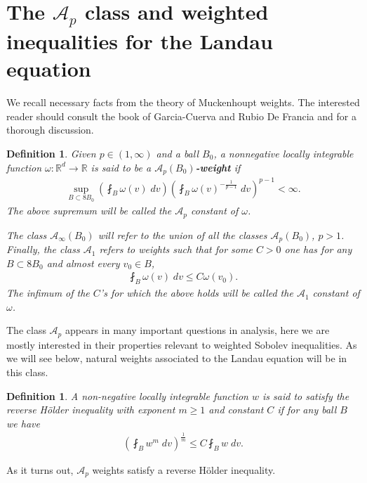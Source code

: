 \documentclass[12pt,american]{amsart}
\numberwithin{equation}{section}
\theoremstyle{plain}
\newtheorem{DEF}[thm]{Definition}
\theoremstyle{definition}                  %
\def\Ap{\mathcal{A}_p}
\def\A1{\mathcal{A}_1}
\def\Ainfty{\mathcal{A}_\infty}
\begin{document}
\section{The $\Ap$ class and weighted inequalities for the Landau equation}\label{section:A_p class and weighted inequalities}

  We recall necessary facts from the theory of Muckenhoupt weights. The interested reader should consult the book of Garcia-Cuerva and Rubio De Francia \cite[Chapter IV]{GarciaCuervaRubioDeFrancia1985} and \cite{Turesson} for a thorough discussion.  
  
  \begin{DEF}
Given $p\in(1,\infty)$ and a ball $B_0$, a nonnegative locally integrable function $\omega:\mathbb{R}^d\to\mathbb{R}$ is said to be a {\bf{$\Ap(B_0)$-weight}} if 
    \begin{align}\label{def_Ap}
      \sup \limits_{B \subset 8B_0}\left( \fint_{B} \omega(v) \;dv \right) \left(\fint_{B} \omega(v)^{-\frac{1}{p-1}} \;dv \right)^{p-1}<\infty.
    \end{align}
   The above supremum will be called the $\Ap$ constant of $\omega$.
    
     The class $\Ainfty(B_0)$ will refer to the union of all the classes $\mathcal{A}_p(B_0)$, $p>1$. Finally, the class $\A1$ refers to weights such that for some $C>0$ one has for any $B\subset 8B_0$ and almost every $v_0 \in B$,
    \begin{align*}
      \fint_{B}\omega(v) \;dv \leq C \omega(v_0).
    \end{align*}
	The infimum of the $C$'s for which the above holds will be called the $\mathcal{A}_1$ constant of $\omega$.
  \end{DEF}
  The class $\Ap$ appears in many important questions in analysis, here we are mostly interested in their properties relevant to weighted Sobolev inequalities. As we will see below, natural weights associated to the Landau equation will be in this class. 
  
  \begin{DEF}A non-negative locally integrable function $w$ is said to satisfy the {\em reverse H\"older inequality} with exponent $m\ge 1 $ and constant $C$ if for any ball $B$ we have
   \begin{align*}
     \left (\fint_{B}w^m\;dv \right )^{\frac{1}{m}} \leq C\fint_{B}w\;dv.
   \end{align*}  
  \end{DEF}
  As it turns out, $\mathcal{A}_p$ weights satisfy a reverse H\"older inequality.
  
\end{document}

